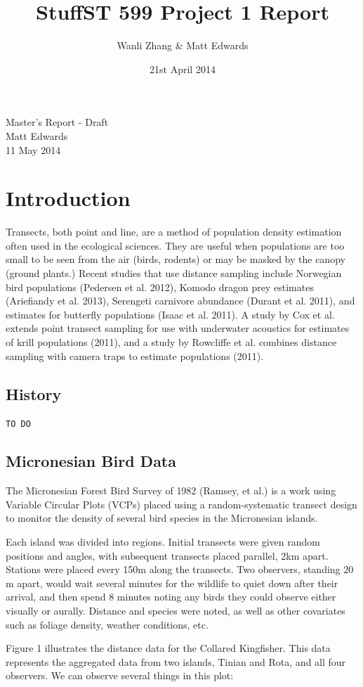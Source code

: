 \documentclass[12pt]{article}
\title{\vspace{-2.0cm}Stuff}
\title{ST 599 Project 1 Report}
\author{Wanli Zhang \& Matt Edwards}
\date{21st April 2014}
\begin{document}
\begingroup  
  \centering
  \LARGE Master's Report - Draft\\[1em]
  \large Matt Edwards\\
  11 May 2014\par
\endgroup

\section{Introduction}
Transects, both point and line, are a method of population density estimation often used in the ecological sciences. They are useful when populations are too small to be seen from the air (birds, rodents) or may be masked by the canopy (ground plants.) Recent studies that use distance sampling include Norwegian bird populations (Pedersen et al. 2012), Komodo dragon prey estimates (Ariefiandy et al. 2013), Serengeti carnivore abundance (Durant et al. 2011), and estimates for butterfly populations (Isaac et al. 2011). A study by Cox et al. extends point transect sampling for use with underwater acoustics for estimates of krill populations (2011), and a study by Rowcliffe et al. combines distance sampling with camera traps to estimate populations (2011). 

\subsection{History}
\texttt{TO DO}

\subsection{Micronesian Bird Data}
The Micronesian Forest Bird Survey of 1982 (Ramsey, et al.) is a work using Variable Circular Plots (VCPs) placed using a random-systematic transect design to monitor the density of several bird species in the Micronesian islands.

Each island was divided into regions. Initial transects were given random positions and angles, with subsequent transects placed parallel, 2km apart. Stations were placed every 150m along the transects. Two observers, standing 20 m apart, would wait several minutes for the wildlife to quiet down after their arrival, and then spend 8 minutes noting any birds they could observe either visually or aurally. Distance and species were noted, as well as other covariates such as foliage density, weather conditions, etc. 

Figure 1 illustrates the distance data for the Collared Kingfisher. This data represents the aggregated data from two islands, Tinian and Rota, and all four observers. We can observe several things in this plot:
\end{document}
